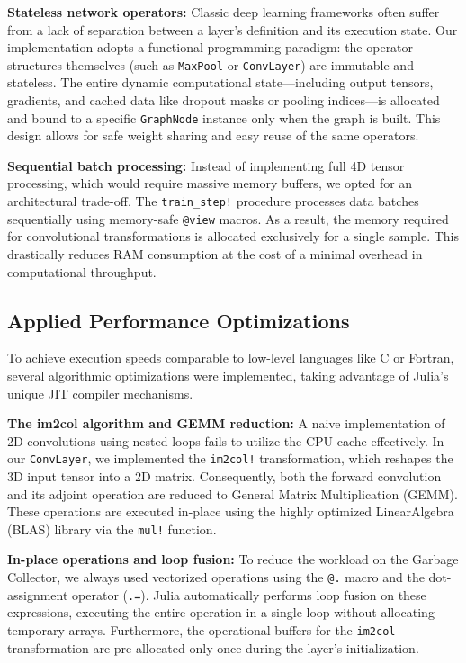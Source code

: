 \documentclass[conference]{IEEEtran}
\begin{document}
\textbf{Stateless network operators:} Classic deep learning frameworks often suffer from a lack of separation between a layer's definition and its execution state. Our implementation adopts a functional programming paradigm: the operator structures themselves (such as \texttt{MaxPool} or \texttt{ConvLayer}) are immutable and stateless. The entire dynamic computational state---including output tensors, gradients, and cached data like dropout masks or pooling indices---is allocated and bound to a specific \texttt{GraphNode} instance only when the graph is built. This design allows for safe weight sharing and easy reuse of the same operators.

\textbf{Sequential batch processing:} Instead of implementing full 4D tensor processing, which would require massive memory buffers, we opted for an architectural trade-off. The \texttt{train\_step!} procedure processes data batches sequentially using memory-safe \texttt{@view} macros. As a result, the memory required for convolutional transformations is allocated exclusively for a single sample. This drastically reduces RAM consumption at the cost of a minimal overhead in computational throughput.

\subsection{Applied Performance Optimizations}
To achieve execution speeds comparable to low-level languages like C or Fortran, several algorithmic optimizations were implemented, taking advantage of Julia's unique JIT compiler mechanisms.

\textbf{The im2col algorithm and GEMM reduction:} A naive implementation of 2D convolutions using nested loops fails to utilize the CPU cache effectively. In our \texttt{ConvLayer}, we implemented the \texttt{im2col!} transformation, which reshapes the 3D input tensor into a 2D matrix. Consequently, both the forward convolution and its adjoint operation are reduced to General Matrix Multiplication (GEMM). These operations are executed in-place using the highly optimized LinearAlgebra (BLAS) library via the \texttt{mul!} function.

\textbf{In-place operations and loop fusion:} To reduce the workload on the Garbage Collector, we always used vectorized operations using the \texttt{@.} macro and the dot-assignment operator (\texttt{.=}). Julia automatically performs loop fusion on these expressions, executing the entire operation in a single loop without allocating temporary arrays. Furthermore, the operational buffers for the \texttt{im2col} transformation are pre-allocated only once during the layer's initialization.
\end{document}
